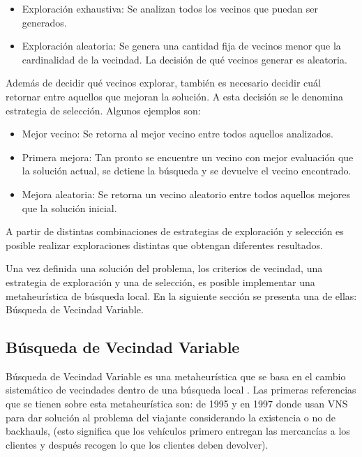 \begin{itemize}
	\item Exploración exhaustiva: Se analizan todos los vecinos que puedan ser generados.
	\item Exploración aleatoria: Se genera una cantidad fija de vecinos menor que la cardinalidad de la vecindad. La decisión de qué vecinos generar es aleatoria.
\end{itemize}

Además de decidir qué vecinos explorar, también es necesario decidir cuál retornar entre aquellos que mejoran la solución. A esta decisión se le denomina estrategia de selección. Algunos ejemplos son:

\begin{itemize}
	\item Mejor vecino: Se retorna al mejor vecino entre todos aquellos analizados.
	\item Primera mejora: Tan pronto se encuentre un vecino con mejor evaluación que la solución actual, se detiene la búsqueda y se devuelve el vecino encontrado.
	\item Mejora aleatoria: Se retorna un vecino aleatorio entre todos aquellos mejores que la solución inicial.
\end{itemize}

A partir de distintas combinaciones de estrategias de exploración y selección es posible realizar exploraciones distintas que obtengan diferentes resultados.

Una vez definida una solución del problema, los criterios de vecindad, una estrategia de exploración y una de selección, es posible implementar una metaheurística de búsqueda local. En la siguiente sección se presenta una de ellas: Búsqueda de Vecindad Variable.

\subsection{Búsqueda de Vecindad Variable} \label{1-vns}

Búsqueda de Vecindad Variable es una metaheurística que se basa en el cambio sistemático de vecindades dentro de una búsqueda local \cite{FirstVRPAPP}. Las primeras referencias que se tienen sobre esta metaheurística son: \cite{mladenovic1995variable} de 1995 y \cite{mladenovic1997variable} en 1997 donde usan VNS para dar solución al problema del viajante considerando la existencia o no de backhauls, (esto significa que los vehículos primero entregan las mercancías a los clientes y después recogen lo que los clientes deben devolver).

